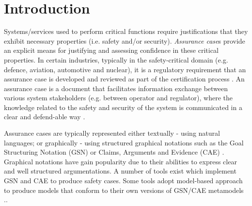\section{Introduction}
Systems/services used to perform critical functions require justifications that they exhibit necessary properties (i.e. safety and/or security). 
\textit{Assurance case}s provide an explicit means for justifying and assessing confidence in these critical properties. 
In certain industries, typically in the safety-critical domain (e.g. defence, aviation, automotive and nuclear), it is a regulatory requirement that an assurance case is developed and reviewed as part of the certification process \cite{healthFound}.
An assurance case is a document that facilitates information exchange between various system stakeholders (e.g. between operator and regulator), where the knowledge related to the safety and security of the system is communicated in a clear and defend-able way \cite{hawkins2013assurance}. 

Assurance cases are typically represented either textually - using natural languages; or graphically - using structured graphical notations such as the Goal Structuring Notation (GSN) \cite{kelly2004goal} or Claims, Arguments and Evidence (CAE) \cite{cae}. 
Graphical notations have gain popularity due to their abilities to express clear and well structured argumentations.
A number of tools exist which implement GSN \cite{denney2017tool, matsuno2010dependability, netkachova2014tool, larrucea2017supporting, yorkgsn, barry2011certware} and CAE \cite{denney2017tool, barry2011certware} to produce safety cases. 
Some tools adopt model-based approach to produce models that conform to their own versions of GSN/CAE metamodels \cite{barry2011certware, larrucea2017supporting}.. 


